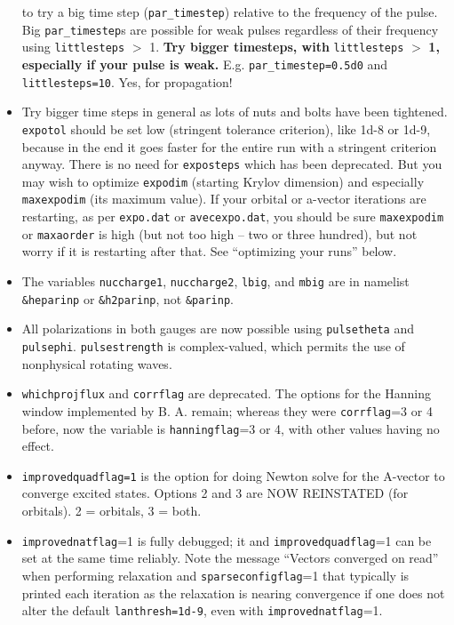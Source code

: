 \documentclass[10pt,leqno, oneside]{book}
\begin{document}
\begin{itemize}
{to try a big time step (\verb#par_timestep#) relative to the frequency of the pulse.  Big \verb#par_timestep#s are possible for weak pulses regardless of their
frequency using
\verb#littlesteps# $>$ 1. \textbf{Try bigger timesteps, with }\verb#littlesteps# $\mathbf{>}$\textbf{ 1, especially if your pulse is weak.} 
E.g. \verb#par_timestep=0.5d0# and \verb#littlesteps=10#.  Yes, for propagation!}
%
\item{ 
Try bigger time steps in general as lots of nuts and bolts have been tightened.  \verb#expotol# should be set low (stringent tolerance criterion), like 1d-8 or 1d-9, because
in the end it goes faster for the entire run with a stringent criterion anyway.
There is no need for \verb#exposteps# which has been deprecated.  But you may wish to optimize \verb#expodim# (starting Krylov dimension) and
especially \verb#maxexpodim# (its maximum value).
  If your orbital or a-vector iterations are restarting, as per \verb#expo.dat# or \verb#avecexpo.dat#, 
  you should be sure \verb#maxexpodim# or \verb#maxaorder# is high (but not too 
  high -- two or three hundred), but not worry if it is restarting after that.  See ``optimizing your runs'' below.}
%
\item{The variables \verb#nuccharge1#, \verb#nuccharge2#, \verb#lbig#, and \verb#mbig# are in namelist \verb#&heparinp# or \verb#&h2parinp#,
not \verb#&parinp#.}
%
\item{All polarizations in both gauges are now possible using \verb#pulsetheta# and \verb#pulsephi#.  \verb#pulsestrength# is complex-valued, which 
permits the use of nonphysical rotating waves.}
%
\item{\verb#whichprojflux# and \verb#corrflag# are deprecated.  The options for the Hanning window implemented by B. A. remain; 
whereas they were \verb#corrflag#=3 or 4 before, now the variable is \verb#hanningflag#=3 or 4, with other values having no effect.}
%
\item{\verb#improvedquadflag=1# is the option for doing Newton solve for the A-vector to converge excited states.  Options 2 and 3 are NOW REINSTATED (for orbitals).  2 = orbitals, 3 = both.}
\item{\verb#improvednatflag#=1 is fully debugged; it 
and \verb#improvedquadflag#=1 can be set at the same time reliably.  Note the message ``Vectors converged on read'' when performing
relaxation and \verb#sparseconfigflag#=1 that typically is printed each iteration as the relaxation is nearing convergence if one does
not alter the default \verb#lanthresh=1d-9#, even with \verb#improvednatflag#=1.}
%
\end{itemize}
\end{document}
